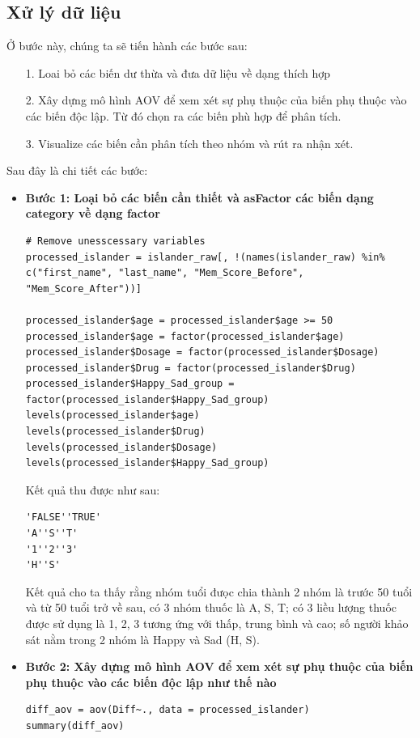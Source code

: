 \subsection{Xử lý dữ liệu}
Ở bước này, chúng ta sẽ tiến hành các bước sau:
\begin{itemize}
    \item [1.] Loai bỏ các biến dư thừa và đưa dữ liệu về dạng thích hợp
    \item [2.] Xây dựng mô hình AOV để xem xét sự phụ thuộc của biến phụ thuộc vào các biến độc lập. Từ đó chọn ra các biến phù hợp để phân tích.
    \item [3.] Visualize các biến cần phân tích theo nhóm và rút ra nhận xét.
\end{itemize}
Sau đây là chi tiết các bước:
\begin{itemize}
    \item \textbf{Bước 1: Loại bỏ các biến cần thiết và asFactor các biến dạng category về dạng factor}

    \begin{lstlisting}
# Remove unesscessary variables
processed_islander = islander_raw[, !(names(islander_raw) %in% c("first_name", "last_name", "Mem_Score_Before", "Mem_Score_After"))]

processed_islander$age = processed_islander$age >= 50
processed_islander$age = factor(processed_islander$age)
processed_islander$Dosage = factor(processed_islander$Dosage)
processed_islander$Drug = factor(processed_islander$Drug)
processed_islander$Happy_Sad_group = factor(processed_islander$Happy_Sad_group)
levels(processed_islander$age)
levels(processed_islander$Drug)
levels(processed_islander$Dosage)
levels(processed_islander$Happy_Sad_group)
    \end{lstlisting}

    Kết quả thu được như sau:
\newpage
\begin{lstlisting}
'FALSE''TRUE'
'A''S''T'
'1''2''3'
'H''S'
\end{lstlisting}

    Kết quả cho ta thấy rằng nhóm tuổi đưọc chia thành 2 nhóm là trước 50 tuổi và từ 50 tuổi trở về sau, có 3 nhóm thuốc là A, S, T; có 3 liều lượng thuốc được sử dụng là 1, 2, 3 tương ứng với thấp, trung bình và cao; số người khảo sát nằm trong 2 nhóm là Happy và Sad (H, S).  


\item \textbf{Bước 2: Xây dựng mô hình AOV để xem xét sự phụ thuộc của biến phụ thuộc vào các biến độc lập như thế nào}
    \begin{lstlisting}
diff_aov = aov(Diff~., data = processed_islander)
summary(diff_aov)
    \end{lstlisting}


\end{itemize}
